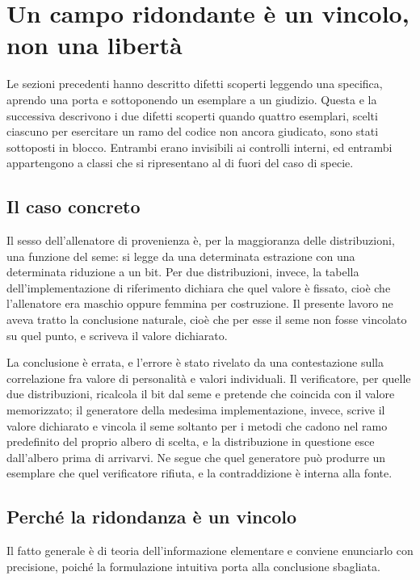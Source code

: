 \section{Un campo ridondante è un vincolo, non una libertà}

Le sezioni precedenti hanno descritto difetti scoperti leggendo una specifica, aprendo una porta e sottoponendo un esemplare a un giudizio. Questa e la successiva descrivono i due difetti scoperti quando quattro esemplari, scelti ciascuno per esercitare un ramo del codice non ancora giudicato, sono stati sottoposti in blocco. Entrambi erano invisibili ai controlli interni, ed entrambi appartengono a classi che si ripresentano al di fuori del caso di specie.

\subsection*{Il caso concreto}

Il sesso dell'allenatore di provenienza è, per la maggioranza delle distribuzioni, una funzione del seme: si legge da una determinata estrazione con una determinata riduzione a un bit. Per due distribuzioni, invece, la tabella dell'implementazione di riferimento dichiara che quel valore è fissato, cioè che l'allenatore era maschio oppure femmina per costruzione. Il presente lavoro ne aveva tratto la conclusione naturale, cioè che per esse il seme non fosse vincolato su quel punto, e scriveva il valore dichiarato.

La conclusione è errata, e l'errore è stato rivelato da una contestazione sulla correlazione fra valore di personalità e valori individuali. Il verificatore, per quelle due distribuzioni, ricalcola il bit dal seme e pretende che coincida con il valore memorizzato; il generatore della medesima implementazione, invece, scrive il valore dichiarato e vincola il seme soltanto per i metodi che cadono nel ramo predefinito del proprio albero di scelta, e la distribuzione in questione esce dall'albero prima di arrivarvi. Ne segue che quel generatore può produrre un esemplare che quel verificatore rifiuta, e la contraddizione è interna alla fonte.

\subsection*{Perché la ridondanza è un vincolo}

Il fatto generale è di teoria dell'informazione elementare e conviene enunciarlo con precisione, poiché la formulazione intuitiva porta alla conclusione sbagliata.

